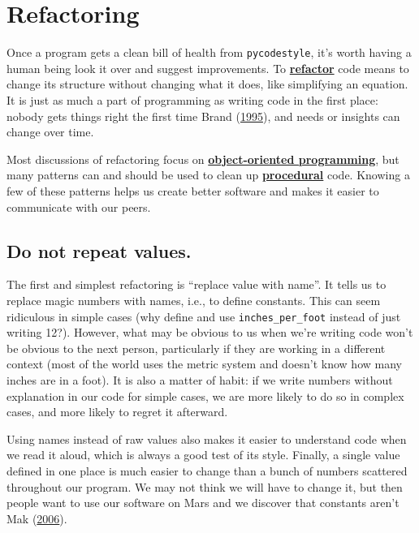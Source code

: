 \documentclass[
]{krantz}
\newcommand{\gref}[2]{\hyperlink{#2}{\textbf{#1}}}
\begin{document}
\hypertarget{style-refactor}{%
\section{Refactoring}\label{style-refactor}}

Once a program gets a clean bill of health from \texttt{pycodestyle},
it's worth having a human being look it over and suggest improvements.
To \gref{refactor}{refactoring} code
means to change its structure without changing what it does,
like simplifying an equation.
It is just as much a part of programming as writing code in the first place:
nobody gets things right the first time Brand (\protect\hyperlink{ref-Bran1995}{1995}),
and needs or insights can change over time.

Most discussions of refactoring focus on \gref{object-oriented programming}{oop},
but many patterns can and should be used to clean up \gref{procedural}{procedural\_programming} code.
Knowing a few of these patterns helps us create better software
and makes it easier to communicate with our peers.

\hypertarget{do-not-repeat-values.}{%
\subsection{Do not repeat values.}\label{do-not-repeat-values.}}

The first and simplest refactoring is ``replace value with name''.
It tells us to replace magic numbers with names,
i.e., to define constants.
This can seem ridiculous in simple cases
(why define and use \texttt{inches\_per\_foot} instead of just writing 12?).
However,
what may be obvious to us when we're writing code won't be obvious to the next person,
particularly if they are working in a different context
(most of the world uses the metric system and doesn't know how many inches are in a foot).
It is also a matter of habit:
if we write numbers without explanation in our code for simple cases,
we are more likely to do so in complex cases,
and more likely to regret it afterward.

Using names instead of raw values also makes it easier to understand code when we read it aloud,
which is always a good test of its style.
Finally,
a single value defined in one place is much easier to change
than a bunch of numbers scattered throughout our program.
We may not think we will have to change it,
but then people want to use our software on Mars and we discover that constants aren't Mak (\protect\hyperlink{ref-Mak2006}{2006}).
\end{document}
